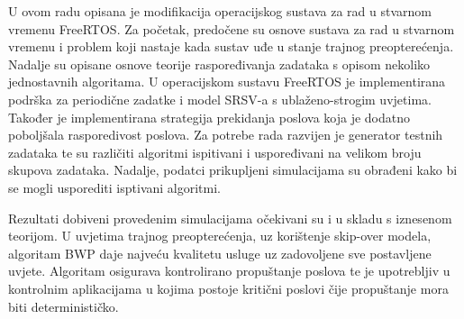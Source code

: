 \documentclass[../zavrsni.tex]{subfiles}
\begin{document}
\sloppy

\justifying

U ovom radu opisana je modifikacija operacijskog sustava za rad u stvarnom vremenu FreeRTOS. Za početak, predočene su osnove sustava za 
rad u stvarnom vremenu i problem koji nastaje kada sustav uđe u stanje trajnog preopterećenja. Nadalje su opisane osnove teorije raspoređivanja 
zadataka s opisom nekoliko jednostavnih algoritama. 
U operacijskom sustavu FreeRTOS je implementirana podrška za periodične zadatke i model SRSV-a s ublaženo-strogim uvjetima.
Također je implementirana strategija prekidanja poslova koja je dodatno poboljšala rasporedivost poslova.
Za potrebe rada razvijen je generator testnih zadataka te su različiti algoritmi ispitivani i uspoređivani na velikom broju skupova zadataka.
Nadalje, podatci prikupljeni simulacijama su obrađeni kako bi se mogli usporediti isptivani algoritmi.

Rezultati dobiveni provedenim simulacijama očekivani su i u skladu s iznesenom teorijom\cite{knjiga_buttazzo}. U uvjetima trajnog preopterećenja, uz korištenje skip-over modela,  
algoritam BWP daje najveću kvalitetu usluge uz zadovoljene sve postavljene uvjete. Algoritam osigurava kontrolirano propuštanje poslova te je upotrebljiv 
u kontrolnim aplikacijama u kojima postoje kritični poslovi čije propuštanje mora biti determinističko.
\end{document}
